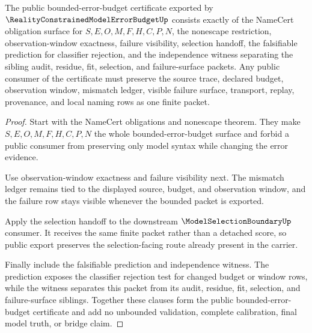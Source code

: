 \begin{theorem}
\label{thm:reality-constrained-model-error-budget-public-certificate}
The public bounded-error-budget certificate exported by $\RealityConstrainedModelErrorBudgetUp$ consists exactly of the NameCert obligation surface for $S,E,O,M,F,H,C,P,N$, the nonescape restriction, observation-window exactness, failure visibility, selection handoff, the falsifiable prediction for classifier rejection, and the independence witness separating the sibling audit, residue, fit, selection, and failure-surface packets. Any public consumer of the certificate must preserve the source trace, declared budget, observation window, mismatch ledger, visible failure surface, transport, replay, provenance, and local naming rows as one finite packet.
\end{theorem}
\begin{proof}
Start with the NameCert obligations and nonescape theorem. They make $S,E,O,M,F,H,C,P,N$ the whole bounded-error-budget surface and forbid a public consumer from preserving only model syntax while changing the error evidence.

Use observation-window exactness and failure visibility next. The mismatch ledger remains tied to the displayed source, budget, and observation window, and the failure row stays visible whenever the bounded packet is exported.

Apply the selection handoff to the downstream $\ModelSelectionBoundaryUp$ consumer. It receives the same finite packet rather than a detached score, so public export preserves the selection-facing route already present in the carrier.

Finally include the falsifiable prediction and independence witness. The prediction exposes the classifier rejection test for changed budget or window rows, while the witness separates this packet from its audit, residue, fit, selection, and failure-surface siblings. Together these clauses form the public bounded-error-budget certificate and add no unbounded validation, complete calibration, final model truth, or bridge claim.
\end{proof}

